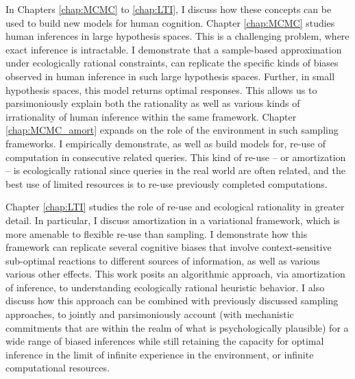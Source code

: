 {In Chapters \ref{chap:MCMC} to \ref{chap:LTI}, I discuss how these concepts can be used to build new models for human cognition. Chapter \ref{chap:MCMC} studies human inferences in large hypothesis spaces. This is a challenging problem, where exact inference is intractable. I demonstrate that a sample-based approximation under ecologically rational constraints, can replicate the specific kinds of biases observed in human inference in such large hypothesis spaces. 
Further, in small hypothesis spaces, this model returns optimal responses. This allows us to parsimoniously explain both the rationality as well as various kinds of irrationality of human inference within the same framework. Chapter \ref{chap:MCMC_amort} expands on the role of the environment in such sampling frameworks. I empirically demonstrate, as well as build models for, re-use of computation in consecutive related queries. This kind of re-use -- or amortization -- is ecologically rational since queries in the real world are often related, and the best use of limited resources is to re-use previously completed computations.

Chapter \ref{chap:LTI} studies the role of re-use and ecological rationality in greater detail. In particular, I discuss amortization in a variational framework, which is more amenable to flexible re-use than sampling. I demonstrate how this framework can replicate several cognitive biases that involve context-sensitive sub-optimal reactions to different sources of information, 
as well as various various other effects.
This work posits an algorithmic approach, via amortization of inference, to understanding ecologically rational heuristic behavior. I also discuss how this approach can be combined with previously discussed sampling approaches, to jointly and parsimoniously account (with mechanistic commitments that are within the realm of what is psychologically plausible) for a wide range of biased inferences while still retaining the capacity for optimal inference in the limit of infinite experience in the environment, or infinite computational resources.

}
